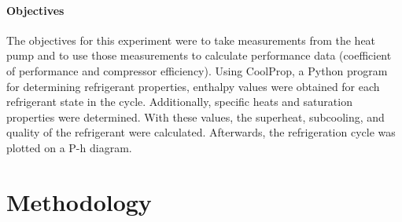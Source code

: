 \documentclass{article}
\begin{document}
	
\paragraph{Objectives}
The objectives for this experiment were to take measurements from the heat pump and to use those measurements to calculate performance data (coefficient of performance and compressor efficiency). Using CoolProp, a Python program for determining refrigerant properties, enthalpy values were obtained for each refrigerant state in the cycle. Additionally, specific heats and saturation properties  were determined. With these values, the superheat, subcooling, and quality of the refrigerant were calculated. Afterwards, the refrigeration cycle was plotted on a P-h diagram. 

\section{Methodology}
\end{document}
